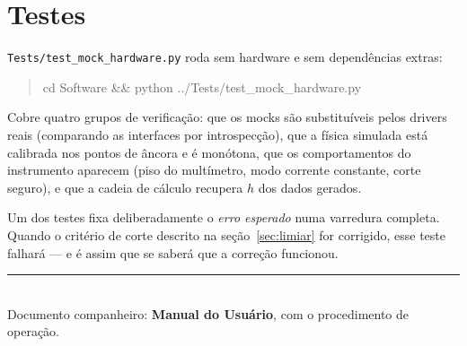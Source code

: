 \documentclass[11pt,a4paper]{article}
\begin{document}
\section{Testes}

\texttt{Tests/test\_mock\_hardware.py} roda sem hardware e sem dependências
extras:

\begin{quote}\ttfamily
cd Software \&\& python ../Tests/test\_mock\_hardware.py
\end{quote}

Cobre quatro grupos de verificação: que os mocks são substituíveis pelos
drivers reais (comparando as interfaces por introspecção), que a física
simulada está calibrada nos pontos de âncora e é monótona, que os
comportamentos do instrumento aparecem (piso do multímetro, modo corrente
constante, corte seguro), e que a cadeia de cálculo recupera $h$ dos dados
gerados.

Um dos testes fixa deliberadamente o \emph{erro esperado} numa varredura
completa. Quando o critério de corte descrito na seção~\ref{sec:limiar} for
corrigido, esse teste falhará --- e é assim que se saberá que a correção
funcionou.

\vfill
\begin{center}
\rule{0.5\linewidth}{0.4pt}\\[0.5em]
\small Documento companheiro: \textbf{Manual do Usuário}, com o procedimento de
operação.
\end{center}
\end{document}
